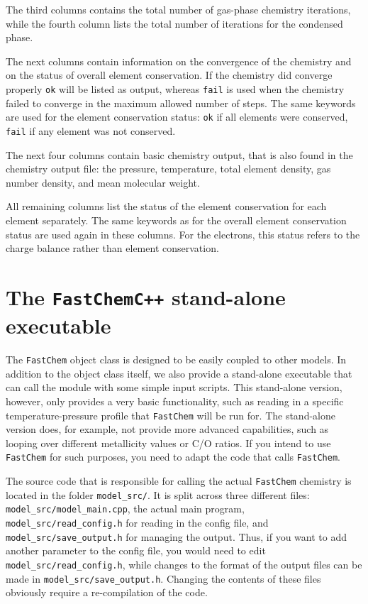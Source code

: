 \documentclass[numbers=noenddot]{aux/fcmanual}
\newcommand{\fc}{\texttt{FastChem}\xspace}
\newcommand{\cpp}{\ttt{C++}\xspace}
\newcommand{\ttt}[1]{\texttt {#1}}
\begin{document}
The third columns contains the total number of gas-phase chemistry iterations, while the fourth column lists the total number of iterations for the condensed phase.

The next columns contain information on the convergence of the chemistry and on the status of overall element conservation. If the chemistry did converge properly \verb|ok| will be listed as output, whereas \verb|fail| is used when the chemistry failed to converge in the maximum allowed number of steps. The same keywords are used for the element conservation status: \verb|ok| if all elements were conserved, \verb|fail| if any element was not conserved. 

The next four columns contain basic chemistry output, that is also found in the chemistry output file: the pressure, temperature, total element density, gas number density, and mean molecular weight.

All remaining columns list the status of the element conservation for each element separately. The same keywords as for the overall element conservation status are used again in these columns. For the electrons, this status refers to the charge balance rather than element conservation.




\chapter{The \fc \cpp stand-alone executable}

The \fc object class is designed to be easily coupled to other models. In addition to the object class itself, we also provide a stand-alone executable that can call the module with some simple input scripts. This stand-alone version, however, only provides a very basic functionality, such as reading in a specific temperature-pressure profile that \fc will be run for. The stand-alone version does, for example, not provide more advanced capabilities, such as looping over different metallicity values or C/O ratios. If you intend to use \fc for such purposes, you need to adapt the code that calls \fc.

The source code that is responsible for calling the actual \fc chemistry is located in the folder \verb|model_src/|. It is split across three different files: \verb|model_src/model_main.cpp|, the actual main program, \verb|model_src/read_config.h| for reading in the config file, and \verb|model_src/save_output.h| for managing the output. Thus, if you want to add another parameter to the config file, you would need to edit \verb|model_src/read_config.h|, while changes to the format of the output files can be made in \verb|model_src/save_output.h|. Changing the contents of these files obviously require a re-compilation of the code.
\end{document}

